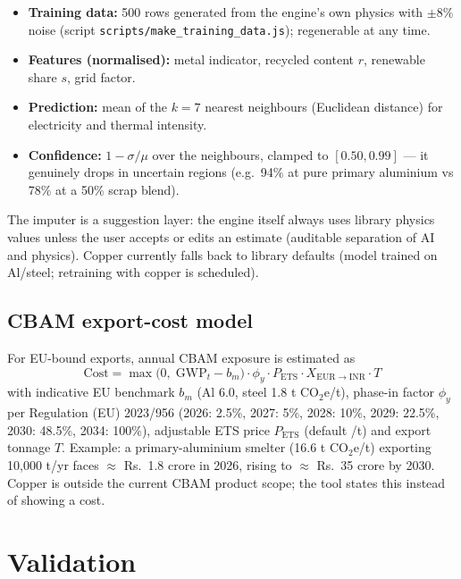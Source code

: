 \documentclass[11pt,a4paper]{article}
\begin{document}
\begin{itemize}[leftmargin=1.4em, itemsep=1pt]
  \item \textbf{Training data:} 500 rows generated from the engine's own physics with
        $\pm 8\%$ noise (script \texttt{scripts/make\_training\_data.js}); regenerable at
        any time.
  \item \textbf{Features (normalised):} metal indicator, recycled content $r$, renewable
        share $s$, grid factor.
  \item \textbf{Prediction:} mean of the $k=7$ nearest neighbours (Euclidean distance) for
        electricity and thermal intensity.
  \item \textbf{Confidence:} $1 - \sigma/\mu$ over the neighbours, clamped to $[0.50, 0.99]$
        --- it genuinely drops in uncertain regions (e.g.\ 94\% at pure primary aluminium
        vs 78\% at a 50\% scrap blend).
\end{itemize}

The imputer is a suggestion layer: the engine itself always uses library physics values
unless the user accepts or edits an estimate (auditable separation of AI and physics).
Copper currently falls back to library defaults (model trained on Al/steel; retraining with
copper is scheduled).

\subsection{CBAM export-cost model}
For EU-bound exports, annual CBAM exposure is estimated as
\begin{equation}
\mathrm{Cost} = \max\!\big(0,\; \mathrm{GWP}_t - b_m\big) \cdot \phi_y \cdot P_{\mathrm{ETS}}
\cdot X_{\mathrm{EUR \to INR}} \cdot T
\end{equation}
with indicative EU benchmark $b_m$ (Al 6.0, steel 1.8 t CO$_2$e/t), phase-in factor
$\phi_y$ per Regulation (EU) 2023/956 (2026: 2.5\%, 2027: 5\%, 2028: 10\%, 2029: 22.5\%,
2030: 48.5\%, 2034: 100\%), adjustable ETS price $P_{\mathrm{ETS}}$ (default /t)
and export tonnage $T$. Example: a primary-aluminium smelter (16.6 t CO$_2$e/t) exporting
10{,}000 t/yr faces $\approx$ Rs.~1.8 crore in 2026, rising to $\approx$ Rs.~35 crore
by 2030. Copper is outside the current CBAM product scope; the tool states this instead of
showing a cost.

\section{Validation}
\end{document}
